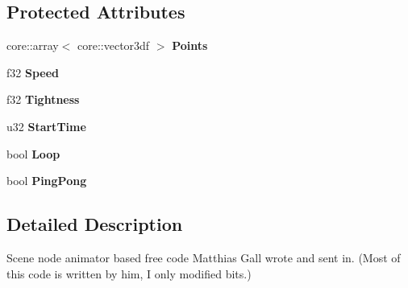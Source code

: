 \subsection*{Protected Attributes}
\begin{DoxyCompactItemize}
\item 
\hypertarget{classirr_1_1scene_1_1_c_scene_node_animator_follow_spline_a6fff000b1bec5914853ec120e09b8e50}{core\-::array$<$ core\-::vector3df $>$ {\bfseries Points}}\label{classirr_1_1scene_1_1_c_scene_node_animator_follow_spline_a6fff000b1bec5914853ec120e09b8e50}

\item 
\hypertarget{classirr_1_1scene_1_1_c_scene_node_animator_follow_spline_a3650c7be980a1dbfd19ccba9317190c1}{f32 {\bfseries Speed}}\label{classirr_1_1scene_1_1_c_scene_node_animator_follow_spline_a3650c7be980a1dbfd19ccba9317190c1}

\item 
\hypertarget{classirr_1_1scene_1_1_c_scene_node_animator_follow_spline_a127c8e99d4fc5c3918bfb13fdd18951f}{f32 {\bfseries Tightness}}\label{classirr_1_1scene_1_1_c_scene_node_animator_follow_spline_a127c8e99d4fc5c3918bfb13fdd18951f}

\item 
\hypertarget{classirr_1_1scene_1_1_c_scene_node_animator_follow_spline_a0915083defa92efda40ed10ea24e8828}{u32 {\bfseries Start\-Time}}\label{classirr_1_1scene_1_1_c_scene_node_animator_follow_spline_a0915083defa92efda40ed10ea24e8828}

\item 
\hypertarget{classirr_1_1scene_1_1_c_scene_node_animator_follow_spline_ac5271c18130e24eee8f3d280999eaa6e}{bool {\bfseries Loop}}\label{classirr_1_1scene_1_1_c_scene_node_animator_follow_spline_ac5271c18130e24eee8f3d280999eaa6e}

\item 
\hypertarget{classirr_1_1scene_1_1_c_scene_node_animator_follow_spline_a132314677c37cf8ddc41026d6fb2e916}{bool {\bfseries Ping\-Pong}}\label{classirr_1_1scene_1_1_c_scene_node_animator_follow_spline_a132314677c37cf8ddc41026d6fb2e916}

\end{DoxyCompactItemize}


\subsection{Detailed Description}
Scene node animator based free code Matthias Gall wrote and sent in. (Most of this code is written by him, I only modified bits.) 


